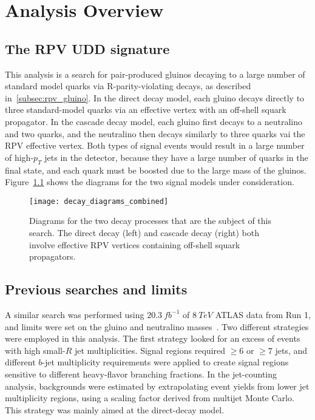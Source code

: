 \chapter{Analysis Overview}\label{ch:analysis_overview}

\section{The RPV UDD signature}\label{sec:signal_of_interest}

This analysis is a search for pair-produced gluinos decaying to a large number of standard model quarks via R-parity-violating decays, as described in~\ref{subsec:rpv_gluino}.
In the direct decay model, each gluino decays directly to three standard-model quarks via an effective vertex with an off-shell squark propagator.
In the cascade decay model, each gluino first decays to a neutralino and two quarks, and the neutralino then decays similarly to three quarks vai the RPV effective vertex.
Both types of signal events would result in a large number of high-$p_{T}$ jets in the detector, because they have a large number of quarks in the final state, and each quark must be boosted due to the large mass of the gluinos.
Figure~\ref{fig:analysis_rpv_decays} shows the diagrams for the two signal models under consideration.

\begin{figure}[ht!]
    \centering
\texttt{[image: decay\_diagrams\_combined]}
\caption{Diagrams for the two decay processes that are the subject of this search. The direct decay (left) and cascade decay (right)
both involve effective RPV vertices containing off-shell squark propagators.}
\label{fig:analysis_rpv_decays}
\end{figure}

\section{Previous searches and limits}\label{sec:run1_limits}

A similar search was performed using $20.3~fb^{-1}$ of $8~TeV$ ATLAS data from Run 1, and limits were set on the gluino and neutralino masses~\cite{run1-multijet}.
Two different strategies were employed in this analysis.
The first strategy looked for an excess of events with high small-$R$ jet multiplicities.
Signal regions required $\geq6$ or $\geq7$ jets, and different $b$-jet multiplicity requirements were applied to create signal regions sensitive to different heavy-flavor branching fractions.
In the jet-counting analysis, backgrounds were estimated by extrapolating event yields from lower jet multiplicity regions, using a scaling factor derived from multijet Monte Carlo.
This strategy was mainly aimed at the direct-decay model.


